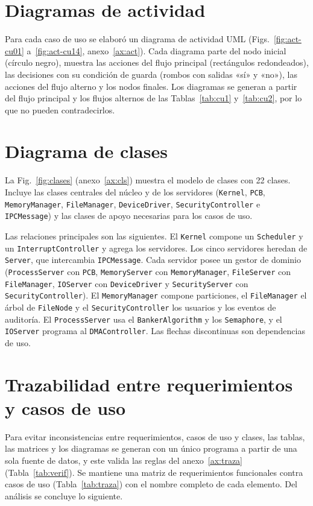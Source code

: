 \documentclass[conference]{IEEEtran}
\begin{document}
\section{Diagramas de actividad}\label{sec:act}
Para cada caso de uso se elaboró un diagrama de actividad UML (Figs.~\ref{fig:act-cu01} a~\ref{fig:act-cu14}, anexo~\ref{ax:act}). Cada diagrama parte del nodo inicial (círculo negro), muestra las acciones del flujo principal (rectángulos redondeados), las decisiones con su condición de guarda (rombos con salidas «sí» y «no»), las acciones del flujo alterno y los nodos finales. Los diagramas se generan a partir del flujo principal y los flujos alternos de las Tablas~\ref{tab:cu1} y~\ref{tab:cu2}, por lo que no pueden contradecirlos.


\section{Diagrama de clases}\label{sec:clases}
La Fig.~\ref{fig:clases} (anexo~\ref{ax:cls}) muestra el modelo de clases con 22 clases. Incluye las clases centrales del núcleo y de los servidores (\texttt{Kernel}, \texttt{PCB}, \texttt{MemoryManager}, \texttt{FileManager}, \texttt{DeviceDriver}, \texttt{SecurityController} e \texttt{IPCMessage}) y las clases de apoyo necesarias para los casos de uso.

Las relaciones principales son las siguientes. El \texttt{Kernel} compone un \texttt{Scheduler} y un \texttt{InterruptController} y agrega los servidores. Los cinco servidores heredan de \texttt{Server}, que intercambia \texttt{IPCMessage}. Cada servidor posee un gestor de dominio (\texttt{ProcessServer} con \texttt{PCB}, \texttt{MemoryServer} con \texttt{MemoryManager}, \texttt{FileServer} con \texttt{FileManager}, \texttt{IOServer} con \texttt{DeviceDriver} y \texttt{SecurityServer} con \texttt{SecurityController}). El \texttt{MemoryManager} compone particiones, el \texttt{FileManager} el árbol de \texttt{FileNode} y el \texttt{SecurityController} los usuarios y los eventos de auditoría. El \texttt{ProcessServer} usa el \texttt{BankerAlgorithm} y los \texttt{Semaphore}, y el \texttt{IOServer} programa al \texttt{DMAController}. Las flechas discontinuas son dependencias de uso.

\section{Trazabilidad entre requerimientos y casos de uso}\label{sec:traza}
Para evitar inconsistencias entre requerimientos, casos de uso y clases, las tablas, las matrices y los diagramas se generan con un único programa a partir de una sola fuente de datos, y este valida las reglas del anexo~\ref{ax:traza} (Tabla~\ref{tab:verif}). Se mantiene una matriz de requerimientos funcionales contra casos de uso (Tabla~\ref{tab:traza}) con el nombre completo de cada elemento. Del análisis se concluye lo siguiente.
\end{document}
